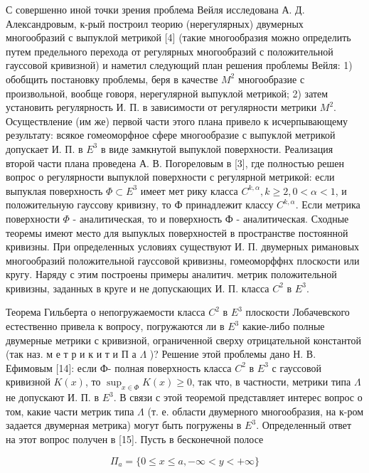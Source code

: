 \documentclass[10pt]{article}
\begin{document}
С совершенно иной точки зрения проблема Вейля исследована А. Д. Александровым, к-рый построил теорию (нерегулярных) двумерных многообразий с выпуклой метрикой [4] (такие многообразия можно определить путем предельного перехода от регулярных многообразий с положительной гауссовой кривизной) и наметил следующий план решения проблемы Вейля: 1) обобщить постановку проблемы, беря в качестве $M^{2}$ многообразие с произвольной, вообще говоря, нерегулярной выпуклой метрикой; 2) затем установить регулярность И. П. в зависимости от регулярности метрики $M^{2}$. Осуществление (им же) первой части этого плана привело к исчерпывающему результату: всякое гомеоморфное сфере многообразие с выпуклой метрикой допускает И. П. в $E^{3}$ в виде замкнутой выпуклой поверхности. Реализация второй части плана проведена А. В. Погореловым в [3], где полностью решен вопрос о регулярности выпуклой поверхности с регулярной метрикой: если выпуклая поверхность $\Phi \subset E^{3}$ имеет мет рику класса $C^{k, \alpha}, k \geqslant 2,0<\alpha<1$, и положительную гауссову кривизну, то Ф принадлежит классу $C^{k, \alpha}$. Если метрика поверхности $\Phi$ - аналитическая, то и поверхность Ф - аналитическая. Сходные теоремы имеют место для выпуклых поверхностей в пространстве постоянной кривизны. При определенных условиях существуют И. П. двумерных римановых многообразий положительной гауссовой кривизны, гомеоморффнх плоскости или кругу. Наряду с этим построены примеры аналитич. метрик положительной кривизны, заданных в круге и не допускающих И. П. класса $C^{2}$ в $E^{3}$.



Теорема Гильберта о непогружаемости класса $C^{2}$ в $E^{3}$ плоскости Лобачевского естественно привела к вопросу, погружаются ли в $E^{3}$ какие-либо полные двумерные метрики с кривизной, ограниченной сверху отрицательной константой (так наз. м е т р и к и т и П а $\Lambda$ )? Решение этой проблемы дано Н. В. Ефимовым [14]: если Ф- полная поверхность класса $C^{2}$ в $E^{3}$ с гауссовой кривизной $K(x)$, то $\sup _{x \in \Phi} K(x) \geqslant 0$, так что, в частности, метрики типа $\Lambda$ не допускают И. П. в $E^{3}$. В связи с этой теоремой представляет интерес вопрос о том, какие части метрик типа $\Lambda$ (т. е. области двумерного многообразия, на к-ром задается двумерная метрика) могут быть погружены в $E^{3}$. Определенный ответ на этот вопрос получен в [15]. Пусть в бесконечной полосе



\[

\Pi_{a}=\{0 \leqslant x \leqslant a,-\infty<y<+\infty\}

\]
\end{document}
